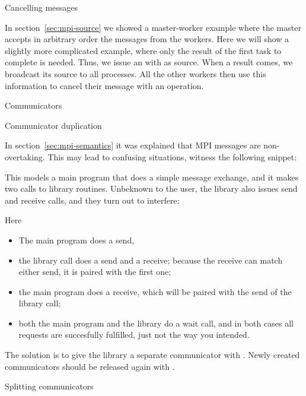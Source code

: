  {Cancelling messages}

In section~\ref{sec:mpi-source} we showed a master-worker example where the 
master accepts in arbitrary order the messages from the workers.
Here we will show a slightly
more complicated example, where only the result of the first task to
complete is needed. Thus, we issue an 
with  as source.  When a result comes, we
broadcast its source to all processes.  All the other workers then use
this information to cancel their message with
an  operation.


 {Communicators}

 {Communicator duplication}

In section~\ref{sec:mpi-semantics} it was explained that MPI messages are 
non-overtaking. This may lead to confusing situations, witness the following snippet:


This models a main program that does a simple message exchange, and it
makes two calls to library routines. Unbeknown to the user, the library also issues send and receive calls, and they turn out to interfere:


Here
\begin{itemize}
\item The main program does a send,
\item the library call  does a send and a receive;
  because the receive can match either send, it is paired with the
  first one;
\item the main program does a receive, which will be paired with the send of the 
  library call;
\item both the main program and the library do a wait call, and in
  both cases all requests are succesfully fulfilled, just not the way
  you intended.
\end{itemize}

The solution is to give the library a separate communicator with
. Newly created communicators should be
released again with .


 {Splitting communicators}

